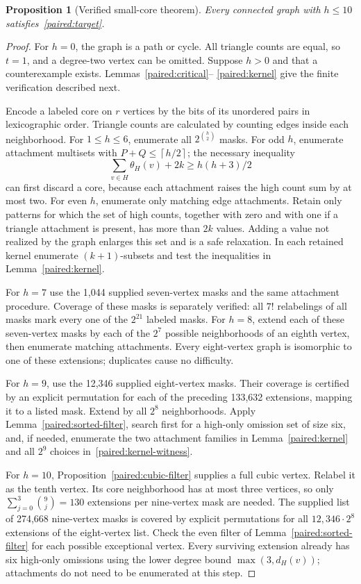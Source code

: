 \documentclass[11pt,a4paper]{article}
\newtheorem{proposition}[theorem]{Proposition}
\theoremstyle{definition}\newtheorem{definition}[theorem]{Definition}
\theoremstyle{remark}\newtheorem{remark}[theorem]{Remark}
\newcommand{\ceil}[1]{\left\lceil#1\right\rceil}
\begin{document}
\begin{proposition}[Verified small-core theorem]\label{paired:small}
Every connected graph with $h\le10$ satisfies~\eqref{paired:target}.
\end{proposition}
\begin{proof}
For $h=0$, the graph is a path or cycle. All triangle counts are equal,
so $t=1$, and a degree-two vertex can be omitted. Suppose $h>0$ and
that a counterexample exists. Lemmas~\ref{paired:critical}--
\ref{paired:kernel} give the finite verification described next.

Encode a labeled core on $r$ vertices by the bits of its unordered
pairs in lexicographic order. Triangle counts are calculated by
counting edges inside each neighborhood. For $1\le h\le6$, enumerate
all $2^{\binom h2}$ masks. For odd $h$, enumerate attachment multisets
with $P+Q\le\ceil{h/2}$; the necessary inequality
\[
 \sum_{v\in H}\theta_H(v)+2k\ge h(h+3)/2
\]
can first discard a core, because each attachment raises the high
count sum by at most two. For even $h$, enumerate only matching
edge attachments. Retain only patterns for which the set of high
counts, together with zero and with one if a triangle attachment is
present, has more than $2k$ values. Adding a value not realized by
the graph enlarges this set and is a safe relaxation. In each retained
kernel enumerate $(k+1)$-subsets and test the inequalities in
Lemma~\ref{paired:kernel}.

For $h=7$ use the 1,044 supplied seven-vertex masks and the same
attachment procedure. Coverage of these masks is separately verified:
all $7!$ relabelings of all masks mark every one of the $2^{21}$
labeled masks. For $h=8$, extend each of these seven-vertex masks
by each of the $2^7$ possible neighborhoods of an eighth vertex,
then enumerate matching attachments. Every eight-vertex graph is
isomorphic to one of these extensions; duplicates cause no difficulty.

For $h=9$, use the 12,346 supplied eight-vertex masks. Their coverage
is certified by an explicit permutation for each of the preceding
133,632 extensions, mapping it to a listed mask. Extend by all $2^8$
neighborhoods. Apply Lemma~\ref{paired:sorted-filter}, search first
for a high-only omission set of size six, and, if needed, enumerate
the two attachment families in Lemma~\ref{paired:kernel} and all
$2^9$ choices in~\eqref{paired:kernel-witness}.

For $h=10$, Proposition~\ref{paired:cubic-filter} supplies a full
cubic vertex. Relabel it as the tenth vertex. Its core neighborhood
has at most three vertices, so only
$\sum_{j=0}^3\binom9j=130$ extensions per nine-vertex mask are needed.
The supplied list of 274,668 nine-vertex masks is covered by explicit
permutations for all $12,346\cdot2^8$ extensions of the eight-vertex
list. Check the even filter of Lemma~\ref{paired:sorted-filter} for
each possible exceptional vertex. Every surviving extension already
has six high-only omissions using the lower degree bound
$\max(3,d_H(v))$; attachments do not need to be enumerated at this step.


\end{proof}
\end{document}
